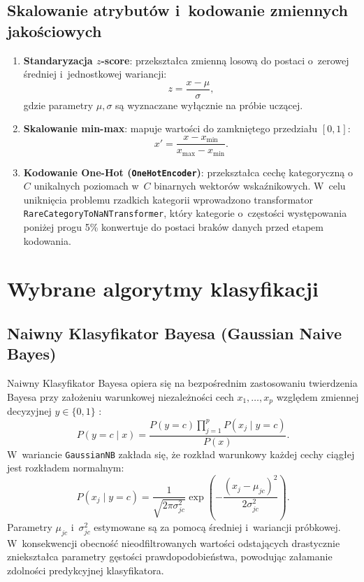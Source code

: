 \subsection{Skalowanie atrybutów i~kodowanie zmiennych jakościowych}
\begin{enumerate}
    \item \textbf{Standaryzacja $z$-score}: przekształca zmienną losową do postaci o~zerowej średniej i~jednostkowej wariancji:
    \begin{equation}
    z = \frac{x - \mu}{\sigma},
    \end{equation}
    gdzie parametry $\mu, \sigma$ są wyznaczane wyłącznie na próbie uczącej.
    \item \textbf{Skalowanie min-max}: mapuje wartości do zamkniętego przedziału $[0, 1]$:
    \begin{equation}
    x' = \frac{x - x_{\min}}{x_{\max} - x_{\min}}.
    \end{equation}
    \item \textbf{Kodowanie One-Hot (\texttt{OneHotEncoder})}: przekształca cechę kategoryczną o~$C$ unikalnych poziomach w~$C$ binarnych wektorów wskaźnikowych. W~celu uniknięcia problemu rzadkich kategorii wprowadzono transformator \texttt{RareCategoryToNaNTransformer}, który kategorie o~częstości występowania poniżej progu 5\% konwertuje do postaci braków danych przed etapem kodowania.
\end{enumerate}

\section{Wybrane algorytmy klasyfikacji}

\subsection{Naiwny Klasyfikator Bayesa (Gaussian Naive Bayes)}
Naiwny Klasyfikator Bayesa opiera się na bezpośrednim zastosowaniu twierdzenia Bayesa przy założeniu warunkowej niezależności cech $x_1, \dots, x_p$ względem zmiennej decyzyjnej $y \in \{0, 1\}$ \cite{SklearnDocs}:
\begin{equation}
P(y = c \mid x) = \frac{P(y = c) \prod_{j=1}^{p} P(x_j \mid y = c)}{P(x)}.
\end{equation}
W~wariancie \texttt{GaussianNB} zakłada się, że rozkład warunkowy każdej cechy ciągłej jest rozkładem normalnym:
\begin{equation}
P(x_j \mid y = c) = \frac{1}{\sqrt{2\pi \sigma_{jc}^2}} \exp\left( -\frac{(x_j - \mu_{jc})^2}{2\sigma_{jc}^2} \right).
\end{equation}
Parametry $\mu_{jc}$ i~$\sigma_{jc}^2$ estymowane są za pomocą średniej i~wariancji próbkowej. W~konsekwencji obecność nieodfiltrowanych wartości odstających drastycznie zniekształca parametry gęstości prawdopodobieństwa, powodując załamanie zdolności predykcyjnej klasyfikatora.

